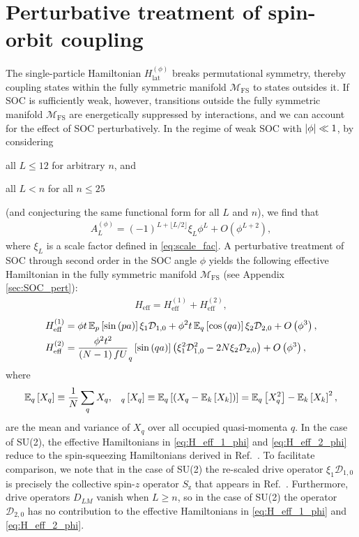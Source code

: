 \documentclass[nofootinbib,notitlepage,11pt]{revtex4-2}
\renewcommand{\t}{\text} %
\newcommand{\f}[2]{\dfrac{#1}{#2}} %
\newcommand{\p}[1]{\left(#1\right)} %
\renewcommand{\sp}[1]{\left[#1\right]} %
\newcommand{\1}{\mathds{1}}
\newcommand{\z}{\text{z}}
\newcommand{\D}{\mathcal{D}}
\newcommand{\M}{\mathcal{M}}
\newcommand{\EE}{\mathbb{E}}
\newcommand{\FS}{\text{FS}}
\let\var\relax
\DeclareMathOperator{\var}{var}
\begin{document}
\section{Perturbative treatment of spin-orbit coupling}
\label{sec:pert_SOC}

The single-particle Hamiltonian $H_{\t{lat}}^{(\phi)}$ breaks
permutational symmetry, thereby coupling states within the fully
symmetric manifold $\M_\FS$ to states outsides it.  If SOC is
sufficiently weak, however, transitions outside the fully symmetric
manifold $\M_\FS$ are energetically suppressed by interactions, and we
can account for the effect of SOC perturbatively.  In the regime of
weak SOC with $\abs{\phi}\ll1$, by considering
\begin{enumerate*}
\item all $L\le12$ for arbitrary $n$, and
\item all $L<n$ for all $n\le25$
\end{enumerate*}
(and conjecturing the same functional form for all $L$ and $n$), we
find that
\begin{align}
  A_L^{(\phi)}
  = \p{-1}^{L+\lfloor L/2\rfloor} \xi_L \phi^L + O\p{\phi^{L+2}},
  \label{eq:A_L_phi_small}
\end{align}
where $\xi_L$ is a scale factor defined in \eqref{eq:scale_fac}.  A
perturbative treatment of SOC through second order in the SOC angle
$\phi$ yields the following effective Hamiltonian in the fully
symmetric manifold $\M_\FS$ (see Appendix \ref{sec:SOC_pert}):
\begin{align}
  H_{\t{eff}} = H_{\t{eff}}^{(1)} + H_{\t{eff}}^{(2)},
\end{align}
\begin{align}
  H_{\t{eff}}^{(1)}
  &= \phi t \, \EE_p\sp{\sin\p{pa}} \xi_1 \D_{1,0}
  + \phi^2 t \, \EE_q\sp{\cos\p{qa}} \xi_2 \D_{2,0}
  + O\p{\phi^3},
  \label{eq:H_eff_1_phi} \\
  H_{\t{eff}}^{(2)}
  &= \f{\phi^2 t^2}{\p{N-1}fU} \var_q\sp{\sin\p{qa}}
  \p{\xi_1^2 \D_{1,0}^2 - 2 N \xi_2 \D_{2,0}}
  + O\p{\phi^3},
  \label{eq:H_eff_2_phi}
\end{align}
where
\begin{align}
  \EE_q\sp{X_q} \equiv \f1N \sum_q X_q,
  &&
  \var_q\sp{X_q} \equiv \EE_q\sp{\p{X_q-\EE_k\sp{X_k}}}
  = \EE_q\sp{X_q^2}-\EE_k\sp{X_k}^2,
\end{align}
are the mean and variance of $X_q$ over all occupied quasi-momenta
$q$.  In the case of SU(2), the effective Hamiltonians in
\eqref{eq:H_eff_1_phi} and \eqref{eq:H_eff_2_phi} reduce to the
spin-squeezing Hamiltonians derived in Ref.~\cite{he2019engineering}.
To facilitate comparison, we note that in the case of SU(2) the
re-scaled drive operator $\xi_1\D_{1,0}$ is precisely the collective
spin-$z$ operator $S_\z$ that appears in
Ref.~\cite{he2019engineering}.  Furthermore, drive operators $D_{LM}$
vanish when $L\ge n$, so in the case of SU(2) the operator $\D_{2,0}$
has no contribution to the effective Hamiltonians in
\eqref{eq:H_eff_1_phi} and \eqref{eq:H_eff_2_phi}.
\end{document}
